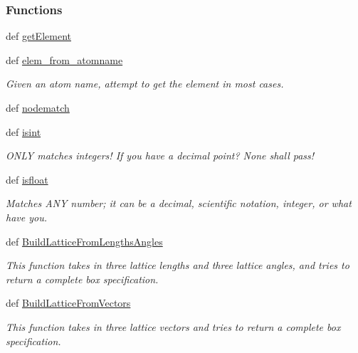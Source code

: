 \subsubsection*{\-Functions}
\begin{DoxyCompactItemize}
\item 
def \hyperlink{namespaceforcebalance_1_1molecule_af28de4693e5b8e82df900d0ac3c6c370}{get\-Element}
\item 
def \hyperlink{namespaceforcebalance_1_1molecule_a7429f0c377d6396711c128f6590ef810}{elem\-\_\-from\-\_\-atomname}
\begin{DoxyCompactList}\small\item\em \-Given an atom name, attempt to get the element in most cases. \end{DoxyCompactList}\item 
def \hyperlink{namespaceforcebalance_1_1molecule_ab8464fea13fad2a506792c2f1d7c93f3}{nodematch}
\item 
def \hyperlink{namespaceforcebalance_1_1molecule_a0dd31eff88d2bed0884ab21a13261d42}{isint}
\begin{DoxyCompactList}\small\item\em \-O\-N\-L\-Y matches integers! \-If you have a decimal point? \-None shall pass! \end{DoxyCompactList}\item 
def \hyperlink{namespaceforcebalance_1_1molecule_afe989ffd119568047fc8265b1d329a70}{isfloat}
\begin{DoxyCompactList}\small\item\em \-Matches \-A\-N\-Y number; it can be a decimal, scientific notation, integer, or what have you. \end{DoxyCompactList}\item 
def \hyperlink{namespaceforcebalance_1_1molecule_a0a6e3e79b04534bf2e83d09def189444}{\-Build\-Lattice\-From\-Lengths\-Angles}
\begin{DoxyCompactList}\small\item\em \-This function takes in three lattice lengths and three lattice angles, and tries to return a complete box specification. \end{DoxyCompactList}\item 
def \hyperlink{namespaceforcebalance_1_1molecule_a29fb1ac9324f4280f07c65baea339989}{\-Build\-Lattice\-From\-Vectors}
\begin{DoxyCompactList}\small\item\em \-This function takes in three lattice vectors and tries to return a complete box specification. \end{DoxyCompactList}\item 

\end{DoxyCompactItemize}
